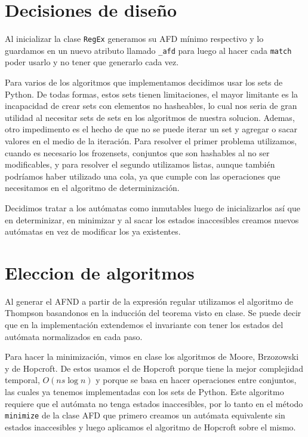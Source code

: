 \section{Decisiones de diseño}
Al inicializar la clase \texttt{RegEx} generamos su AFD mínimo respectivo 
y lo guardamos en un nuevo atributo llamado \texttt{\_afd} para luego al hacer cada 
\texttt{match} poder usarlo y no tener que generarlo cada vez.

Para varios de los algoritmos que implementamos decidimos usar los sets de Python. De todas formas, estos sets tienen limitaciones,
el mayor limitante es la incapacidad de crear sets con elementos no hasheables, lo cual nos seria de gran utilidad al necesitar sets de sets en los algoritmos de nuestra solucion. 
Ademas, otro impedimento es el hecho de que no se puede iterar un set y agregar o sacar valores en el medio de la iteración. Para resolver el primer problema utilizamos, 
cuando es necesario los frozensets, conjuntos que son hashables al no ser modificables, y para resolver el segundo utilizamos listas, aunque también podríamos haber utilizado una cola,
ya que cumple con las operaciones que necesitamos en el algoritmo de determinización.

Decidimos tratar a los autómatas como inmutables luego de inicializarlos así que en determinizar, en minimizar y al sacar los 
estados inaccesibles creamos nuevos autómatas en vez de modificar los ya existentes.

\section{Eleccion de algoritmos}
Al generar el AFND a partir de la expresión regular utilizamos el algoritmo de Thompson basandonos 
en la inducción del teorema visto en clase. Se puede decir que en la implementación extendemos el invariante 
con tener los estados del autómata normalizados en cada paso.

Para hacer la minimización, vimos en clase los algoritmos de Moore, Brzozowski y de Hopcroft. 
De estos usamos el de Hopcroft porque tiene la mejor complejidad temporal, $O(ns \log{n})$ 
y porque se basa en hacer operaciones entre conjuntos, las cuales ya tenemos implementadas con los sets de Python.
Este algoritmo requiere que el autómata no tenga estados inaccesibles, por lo tanto en el método \texttt{minimize}  
de la clase AFD que primero creamos un autómata equivalente sin estados inaccesibles y luego aplicamos el algoritmo de Hopcroft sobre el mismo.

